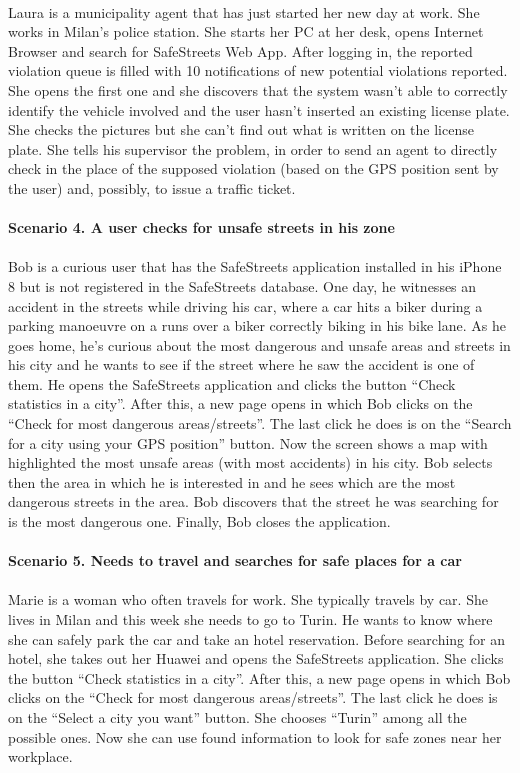 \documentclass[a4paper]{report}
\begin{document}
\\
Laura is a municipality agent that has just started her new day at work. She works in Milan's police station. She starts her PC at her desk, opens Internet Browser and search for SafeStreets Web App. After logging in, the reported violation queue is filled with 10 notifications of new potential violations reported. She opens the first one and she discovers that the system wasn't able to correctly identify the vehicle involved and the user hasn't inserted an existing license plate. She checks the pictures but she can't find out what is written on the license plate. She tells his supervisor the problem, in order to send an agent to directly check in the place of the supposed violation (based on the GPS position sent by the user) and, possibly, to issue a traffic ticket.
\\
\\
\textbf{Scenario 4. A user checks for unsafe streets in his zone}\\
\\
Bob is a curious user that has the SafeStreets application installed in his iPhone 8 but is not registered in the SafeStreets database. One day, he witnesses an accident in the streets while driving his car, where a car hits a biker during a parking manoeuvre on a runs over a biker correctly biking in his bike lane.
As he goes home, he’s curious about the most dangerous and unsafe areas and streets in his city and he wants to see if the street where he saw the accident is one of them. He opens the SafeStreets application and clicks the button “Check statistics in a city”. After this, a new page opens in which Bob clicks on the “Check for most dangerous areas/streets”. The last click he does is on the “Search for a city using your GPS position” button. Now the screen shows a map with highlighted the most unsafe areas (with most accidents) in his city. Bob selects then the area in which he is interested in and he sees which are the most dangerous streets in the area. Bob discovers that the street he was searching for is the most dangerous one. Finally, Bob closes the application.
\\
\\
\textbf{Scenario 5. Needs to travel and searches for safe places for a car}\\
\\
Marie is a woman who often travels for work. She typically travels by car. She lives in Milan and this week she needs to go to Turin. He wants to know where she can safely park the car and take an hotel reservation. Before searching for an hotel, she takes out her Huawei and opens the SafeStreets application. She clicks the button “Check statistics in a city”. After this, a new page opens in which Bob clicks on the “Check for most dangerous areas/streets”. The last click he does is on the “Select a city you want” button. She chooses “Turin” among all the possible ones. Now she can use found information to look for safe zones near her workplace.
\end{document}
